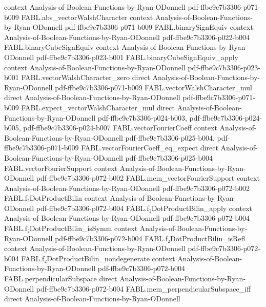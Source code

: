 \begin{theorem}
  {context}
  {Analysis-of-Boolean-Functions-by-Ryan-ODonnell}
  {pdf-ffbe9c7b3306-p071-b009}
\proofstep
  {FABL.abs_vectorWalshCharacter}
  {context}
  {Analysis-of-Boolean-Functions-by-Ryan-ODonnell}
  {pdf-ffbe9c7b3306-p071-b009}
\proofstep
  {FABL.binarySignEquiv}
  {context}
  {Analysis-of-Boolean-Functions-by-Ryan-ODonnell}
  {pdf-ffbe9c7b3306-p022-b004}
\proofstep
  {FABL.binaryCubeSignEquiv}
  {context}
  {Analysis-of-Boolean-Functions-by-Ryan-ODonnell}
  {pdf-ffbe9c7b3306-p023-b001}
\proofstep
  {FABL.binaryCubeSignEquiv_apply}
  {context}
  {Analysis-of-Boolean-Functions-by-Ryan-ODonnell}
  {pdf-ffbe9c7b3306-p023-b001}
\proofstep
  {FABL.vectorWalshCharacter_zero}
  {direct}
  {Analysis-of-Boolean-Functions-by-Ryan-ODonnell}
  {pdf-ffbe9c7b3306-p071-b009}
\proofstep
  {FABL.vectorWalshCharacter_mul}
  {direct}
  {Analysis-of-Boolean-Functions-by-Ryan-ODonnell}
  {pdf-ffbe9c7b3306-p071-b009}
\proofstep
  {FABL.expect_vectorWalshCharacter_mul}
  {direct}
  {Analysis-of-Boolean-Functions-by-Ryan-ODonnell}
  {pdf-ffbe9c7b3306-p024-b003,
    pdf-ffbe9c7b3306-p024-b005,
    pdf-ffbe9c7b3306-p024-b007}
\proofstep
  {FABL.vectorFourierCoeff}
  {context}
  {Analysis-of-Boolean-Functions-by-Ryan-ODonnell}
  {pdf-ffbe9c7b3306-p025-b004,
    pdf-ffbe9c7b3306-p071-b009}
\proofstep
  {FABL.vectorFourierCoeff_eq_expect}
  {direct}
  {Analysis-of-Boolean-Functions-by-Ryan-ODonnell}
  {pdf-ffbe9c7b3306-p025-b004}
\proofstep
  {FABL.vectorFourierSupport}
  {context}
  {Analysis-of-Boolean-Functions-by-Ryan-ODonnell}
  {pdf-ffbe9c7b3306-p072-b002}
\proofstep
  {FABL.mem_vectorFourierSupport}
  {context}
  {Analysis-of-Boolean-Functions-by-Ryan-ODonnell}
  {pdf-ffbe9c7b3306-p072-b002}
\proofstep
  {FABL.f₂DotProductBilin}
  {context}
  {Analysis-of-Boolean-Functions-by-Ryan-ODonnell}
  {pdf-ffbe9c7b3306-p072-b004}
\proofstep
  {FABL.f₂DotProductBilin_apply}
  {context}
  {Analysis-of-Boolean-Functions-by-Ryan-ODonnell}
  {pdf-ffbe9c7b3306-p072-b004}
\proofstep
  {FABL.f₂DotProductBilin_isSymm}
  {context}
  {Analysis-of-Boolean-Functions-by-Ryan-ODonnell}
  {pdf-ffbe9c7b3306-p072-b004}
\proofstep
  {FABL.f₂DotProductBilin_isRefl}
  {context}
  {Analysis-of-Boolean-Functions-by-Ryan-ODonnell}
  {pdf-ffbe9c7b3306-p072-b004}
\proofstep
  {FABL.f₂DotProductBilin_nondegenerate}
  {context}
  {Analysis-of-Boolean-Functions-by-Ryan-ODonnell}
  {pdf-ffbe9c7b3306-p072-b004}
\proofstep
  {FABL.perpendicularSubspace}
  {direct}
  {Analysis-of-Boolean-Functions-by-Ryan-ODonnell}
  {pdf-ffbe9c7b3306-p072-b004}
\proofstep
  {FABL.mem_perpendicularSubspace_iff}
  {direct}
  {Analysis-of-Boolean-Functions-by-Ryan-ODonnell}

\end{theorem}
